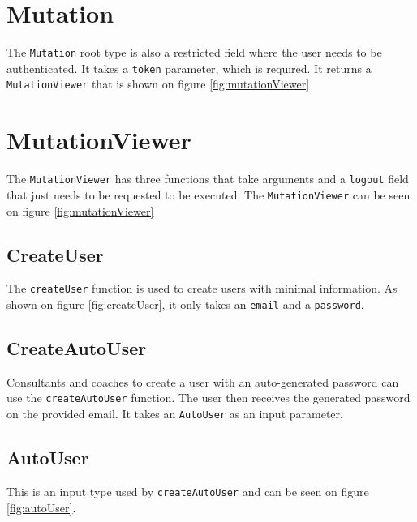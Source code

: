 \section{Mutation}
\label{sec:mutation}
The \verb+Mutation+ root type is also a restricted field where the user needs to be authenticated. 
It takes a \verb+token+ parameter, which is required. 
It returns a \verb+MutationViewer+ that is shown on figure \ref{fig:mutationViewer}

\section{MutationViewer}
The \verb+MutationViewer+ has three functions that take arguments and a \verb+logout+ field that just needs to be requested to be executed. The \verb+MutationViewer+ can be seen on figure \ref{fig:mutationViewer}

\subsection{CreateUser}
\label{sec:createUser}
The \verb+createUser+ function is used to create users with minimal information. 
As shown on figure \ref{fig:createUser}, it only takes an \verb+email+ and a \verb+password+.

\subsection{CreateAutoUser}
\label{sec:createAutoUser}
Consultants and coaches to create a user with an auto-generated password can use the \verb+createAutoUser+ function.
The user then receives the generated password on the provided email.
It takes an \verb+AutoUser+ as an input parameter.

\subsection{AutoUser}
This is an input type used by \verb+createAutoUser+ and can be seen on figure \ref{fig:autoUser}.

